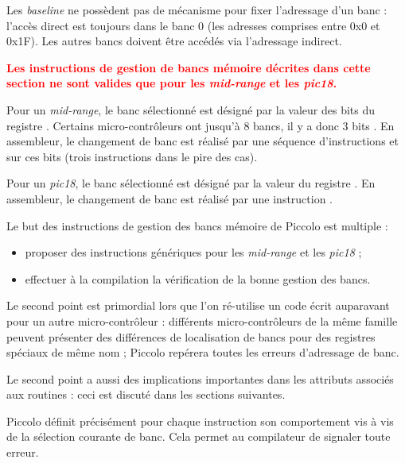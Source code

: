 
Les \emph{baseline} ne possèdent pas de mécanisme pour fixer l'adressage d'un banc : l'accès direct est toujours dans le banc 0 (les adresses comprises entre 0x0 et 0x1F). Les autres bancs doivent être accédés via l'adressage indirect.

\textcolor{red}{\bf Les instructions de gestion de bancs mémoire décrites dans cette section ne sont valides que pour les \emph{mid-range} et les \emph{pic18}.}

Pour un \emph{mid-range}, le banc sélectionné est désigné par la valeur des bits  du registre . Certains micro-contrôleurs ont jusqu'à 8 bancs, il y a donc 3 bits . En assembleur, le changement de banc est réalisé par une séquence d'instructions  et  sur ces bits (trois instructions dans le pire des cas). 


Pour un \emph{pic18}, le banc sélectionné est désigné par la valeur du registre . En assembleur, le changement de banc est réalisé par une instruction .

Le but des instructions de gestion des bancs mémoire de Piccolo est multiple :
\begin{itemize}
  \item proposer des instructions génériques pour les \emph{mid-range} et les \emph{pic18} ;
  \item effectuer à la compilation la vérification de la bonne gestion des bancs.
\end{itemize}

Le second point est primordial lors que l'on ré-utilise un code écrit auparavant pour un autre micro-contrôleur : différents micro-contrôleurs de la même famille peuvent présenter des différences de localisation de bancs pour des registres spéciaux de même nom ; Piccolo repérera toutes les erreurs d'adressage de banc.

Le second point a aussi des implications importantes dans les attributs associés aux routines : ceci est discuté dans les sections suivantes.









Piccolo définit précisément pour chaque instruction son comportement vis à vis de la sélection courante de banc. Cela permet au compilateur de signaler toute erreur.


